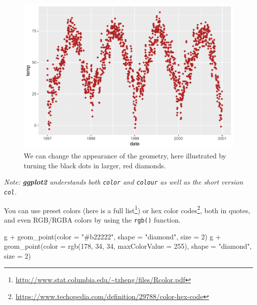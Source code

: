 \documentclass[
]{krantz}
\makeatletter
\newenvironment{Shaded}{\begin{snugshade}}{\end{snugshade}}
\newcommand{\AttributeTok}[1]{\textcolor[rgb]{0.61,0.61,0.61}{#1}}
\newcommand{\DecValTok}[1]{\textcolor[rgb]{0.06,0.06,0.06}{#1}}
\newcommand{\FunctionTok}[1]{\textcolor[rgb]{0,0,0}{#1}}
\newcommand{\NormalTok}[1]{#1}
\newcommand{\SpecialCharTok}[1]{\textcolor[rgb]{0,0,0}{#1}}
\newcommand{\StringTok}[1]{\textcolor[rgb]{0.5,0.5,0.5}{#1}}
\renewcommand{\href}[2]{#2\footnote{\url{#1}}}
\newenvironment{kframe}{%
\medskip{}
\setlength{\fboxsep}{.8em}
 \def\at@end@of@kframe{}%
 \ifinner\ifhmode%
  \def\at@end@of@kframe{\end{minipage}}%
  \begin{minipage}{\columnwidth}%
 \fi\fi%
 \def\FrameCommand##1{\hskip\@totalleftmargin \hskip-\fboxsep
 \colorbox{shadecolor}{##1}\hskip-\fboxsep
     \hskip-\linewidth \hskip-\@totalleftmargin \hskip\columnwidth}%
 \MakeFramed {\advance\hsize-\width
   \@totalleftmargin\z@ \linewidth\hsize
   \@setminipage}}%
 {\par\unskip\endMakeFramed%
 \at@end@of@kframe}
\renewenvironment{Shaded}{\begin{kframe}}{\end{kframe}}
\makeatother
\begin{document}
\begin{figure}
\centering
\includegraphics{bookdown_files/figure-latex/ggplot-default-col-size-shape-1.pdf}
\caption{\label{fig:ggplot-default-col-size-shape}We can change the appearance of the geometry, here illustrated by turning the black dots in larger, red diamonds.}
\end{figure}

\emph{Note: \textbf{ggplot2} understands both \texttt{color} and \texttt{colour} as well as the short version \texttt{col}.}

You can use preset colors (here is a \href{http://www.stat.columbia.edu/~tzheng/files/Rcolor.pdf}{full list}) or \href{https://www.techopedia.com/definition/29788/color-hex-code}{hex color codes}, both in quotes, and even RGB/RGBA colors by using the \texttt{rgb()} function.

\begin{Shaded}
\begin{Highlighting}[]
\NormalTok{g }\SpecialCharTok{+} \FunctionTok{geom\_point}\NormalTok{(}\AttributeTok{color =} \StringTok{"\#b22222"}\NormalTok{, }\AttributeTok{shape =} \StringTok{"diamond"}\NormalTok{, }\AttributeTok{size =} \DecValTok{2}\NormalTok{)}
\NormalTok{g }\SpecialCharTok{+} \FunctionTok{geom\_point}\NormalTok{(}\AttributeTok{color =} \FunctionTok{rgb}\NormalTok{(}\DecValTok{178}\NormalTok{, }\DecValTok{34}\NormalTok{, }\DecValTok{34}\NormalTok{, }\AttributeTok{maxColorValue =} \DecValTok{255}\NormalTok{), }\AttributeTok{shape =} \StringTok{"diamond"}\NormalTok{, }\AttributeTok{size =} \DecValTok{2}\NormalTok{)}
\end{Highlighting}
\end{Shaded}
\end{document}
